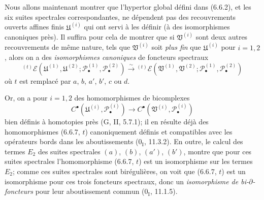\begin{env}[6.6.7]
Nous allons maintenant montrer que l'hypertor global défini dans (6.6.2), et
les six suites spectrales correspondantes, ne dépendent pas des recouvrements
ouverts affines finis $\mathfrak U^{(i)}$ qui ont servi à les définir (à des
isomorphismes canoniques près). Il suffira pour cela de montrer que si
$\mathfrak V^{(i)}$ sont deux autres recouvrements de même nature, tels que
$\mathfrak V^{(i)}$ soit \emph{plus fin} que $\mathfrak U^{(i)}$ pour
$i=1,2$, alors on a des \emph{isomorphismes canoniques} de foncteurs spectraux
\[
  {}^{(t)}\mathscr E
  (\mathfrak U^{(1)},\mathfrak U^{(2)};
   \mathscr P_\bullet^{(1)},\mathscr P_\bullet^{(2)})
  \xrightarrow{\sim}
  {}^{(t)}\mathscr E
  (\mathfrak V^{(1)},\mathfrak V^{(2)};
   \mathscr P_\bullet^{(1)},\mathscr P_\bullet^{(2)})
  \tag{6.6.7, $t$}\label{III.6.6.7.t.fr}
\]
où $t$ est remplacé par $a$, $b$, $a'$, $b'$, $c$ ou $d$.

Or, on a pour $i=1,2$ des homomorphismes de bicomplexes
\[
  C^\bullet(\mathfrak U^{(i)},\mathscr P_\bullet^{(i)})
  \longrightarrow
  C^\bullet(\mathfrak V^{(i)},\mathscr P_\bullet^{(i)})
\]
bien définis à homotopies près (G, II, 5.7.1); il en résulte déjà des
homomorphismes (6.6.7, $t$) canoniquement définis et compatibles avec les
opérateurs bords dans les aboutissements ($0_{\mathrm I}$, 11.3.2). En outre,
le calcul des termes $E_2$ des suites spectrales $(a)$, $(b)$, $(a')$, $(b')$,
montre que pour ces suites spectrales l'homomorphisme (6.6.7, $t$) est un
isomorphisme sur les termes $E_2$; comme ces suites spectrales sont
birégulières, on voit que (6.6.7, $t$) est un isomorphisme pour ces trois
foncteurs spectraux, donc un \emph{isomorphisme de bi-$\partial$-foncteurs}
pour leur aboutissement commun ($0_{\mathrm I}$, 11.1.5).


\end{env}
